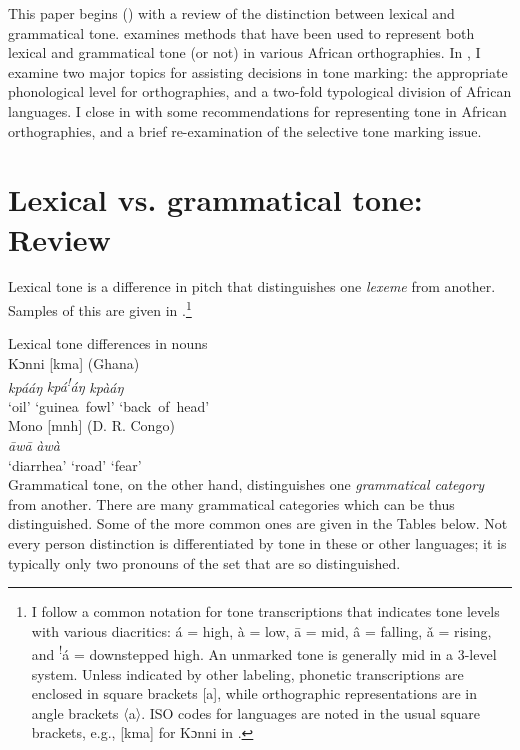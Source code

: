 \documentclass[output=paper]{langscibook}
\begin{document}
This paper begins () with a review of the distinction between lexical and grammatical tone.  examines methods that have been used to represent both lexical and grammatical tone (or not) in various African orthographies. In , I examine two major topics for assisting decisions in tone marking: the appropriate phonological level for orthographies, and a two-fold typological division of African languages. I close in  with some recommendations for representing tone in African orthographies, and a brief re-examination of the selective tone marking issue.

\section{Lexical vs. grammatical tone: Review}
\label{sec:LexicalVgrammaticalTone:2}
Lexical tone is a difference in pitch that distinguishes one \textit{lexeme} from another. Samples of this are given in .\footnote{I follow a common notation for tone transcriptions that indicates tone levels with various diacritics: á = high, à = low, ā = mid, â = falling, ǎ = rising, and \textsuperscript{!}á = downstepped high. An unmarked tone is generally mid in a 3-level system. Unless indicated by other labeling, phonetic transcriptions are enclosed in square brackets [a], while orthographic representations are in angle brackets 〈a〉. ISO codes for languages are noted in the usual square brackets, e.g., [kma] for Kɔnni in .}

\ea Lexical tone differences in nouns\\
\label{tab:LexicalToneDifferencesNouns:1}
\ea
Kɔnni [kma] (Ghana) \citep[306]{Cahill2007}\\
\gll \textit{kpááŋ} \textit{kpá\textsuperscript{!}}\textit{áŋ} \textit{kpàáŋ}\\
‘oil’ ‘guinea~fowl’ ‘back~of~head’ \\
\ex
Mono [mnh] (D. R. Congo) \citep[198]{Olson2005}\\
 {\textit{\=aw\=a}}  {\textit{àwà}}\\
‘diarrhea’ ‘road’ ‘fear’ \\
\z\z
Grammatical tone, on the other hand, distinguishes one \textit{grammatical category} from another. There are many grammatical categories which can be thus distinguished. Some of the more common ones are given in the Tables below. Not every person distinction is differentiated by tone in these or other languages; it is typically only two pronouns of the set that are so distinguished.
\end{document}
